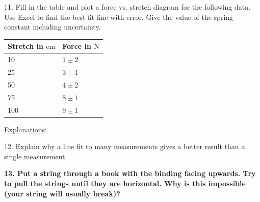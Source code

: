 11. Fill in the table and plot a force vs. stretch diagram for the following data. Use Excel to find the best fit line with error. Give the value of the spring constant including uncertainty.
\begin{table}[h]
    \centering
    \begin{tabular}{|l|l|}
        \hline
        Stretch in $\mathrm{cm}$ & Force in $\mathrm{N}$ \\ \hline
        10 & $1\pm 2$ \\ \hline
        25 & $3\pm 1$ \\ \hline
        50 & $4\pm 2$ \\ \hline
        75 & $8\pm 1$ \\ \hline
        100 & $9\pm 1$ \\ \hline
    \end{tabular}
\end{table}

\noindent \underline{Explanations}:\myskip

12. Explain why a line fit to many measurements gives a better result than a single measurement. \myskip

{\bf{13. Put a string through a book with the binding facing upwards. Try to pull the strings until they are horizontal.  Why is this impossible (your string will usually break)?}}
